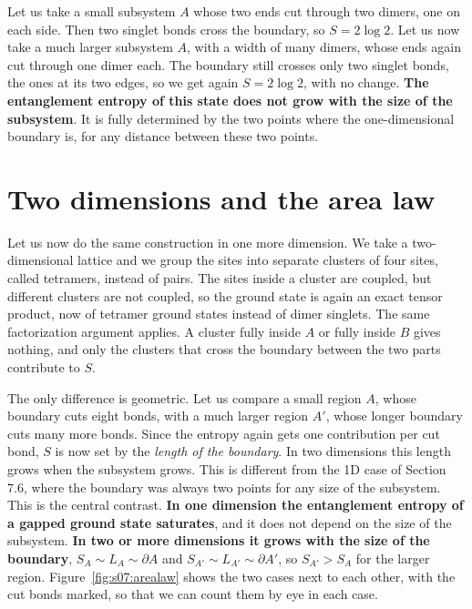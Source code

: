 Let us take a small subsystem $A$ whose two ends cut through two dimers, one on each side. Then two
singlet bonds cross the boundary, so $S = 2\log 2$. Let us now take a much larger subsystem $A$, with
a width of many dimers, whose ends again cut through one dimer each. The boundary still crosses only
two singlet bonds, the ones at its two edges, so we get again $S = 2\log 2$,
with no change. \textbf{The entanglement entropy of this state does not grow with the size of the
subsystem}. It is fully determined by the two points where the one-dimensional boundary is, for any
distance between these two points.

\section{Two dimensions and the area law}

Let us now do the same construction in one more dimension. We take a two-dimensional lattice and we
group the sites into separate clusters of four sites, called tetramers, instead of pairs. The sites
inside a cluster are coupled, but different clusters are not coupled, so the ground state is again an
exact tensor product, now of tetramer ground states instead of dimer singlets. The same factorization
argument applies. A cluster fully inside $A$ or fully inside $B$ gives nothing, and only the clusters
that cross the boundary between the two parts contribute to $S$.

The only difference is geometric. Let us compare a small region $A$, whose boundary cuts eight bonds,
with a much larger region $A'$, whose longer boundary cuts many more bonds. Since the entropy again
gets one contribution per cut bond, $S$ is now set by the \emph{length of the boundary}. In two
dimensions this length grows when the subsystem grows. This is different from the 1D case of
Section 7.6, where the boundary was always two points for any size of the subsystem. This is the
central contrast. \textbf{In one dimension the entanglement entropy of a gapped ground state
saturates}, and it does not depend on the size of the subsystem. \textbf{In two or more dimensions it
grows with the size of the boundary}, $S_A \sim
L_A \sim \partial A$ and $S_{A'} \sim L_{A'} \sim \partial A'$, so $S_{A'} > S_A$ for the larger region.
Figure~\ref{fig:s07:arealaw} shows the two cases next to each other, with the cut bonds marked, so
that we can count them by eye in each case.



